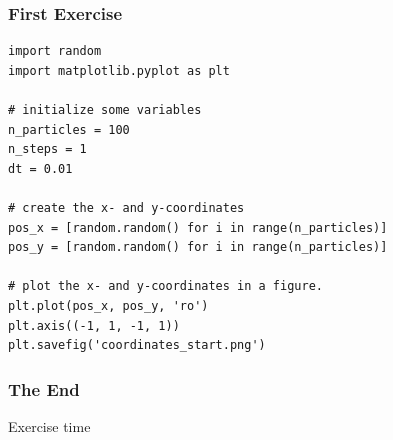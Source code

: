 \documentclass{beamer}
\begin{document}
\begin{frame}[fragile]

    \frametitle{First Exercise}

\begin{lstlisting}
import random
import matplotlib.pyplot as plt

# initialize some variables
n_particles = 100
n_steps = 1
dt = 0.01

# create the x- and y-coordinates
pos_x = [random.random() for i in range(n_particles)]
pos_y = [random.random() for i in range(n_particles)]

# plot the x- and y-coordinates in a figure.
plt.plot(pos_x, pos_y, 'ro')
plt.axis((-1, 1, -1, 1))
plt.savefig('coordinates_start.png')

\end{lstlisting}


\end{frame}





\frame
{
    \frametitle{The End}

    Exercise time

}




\end{document}
